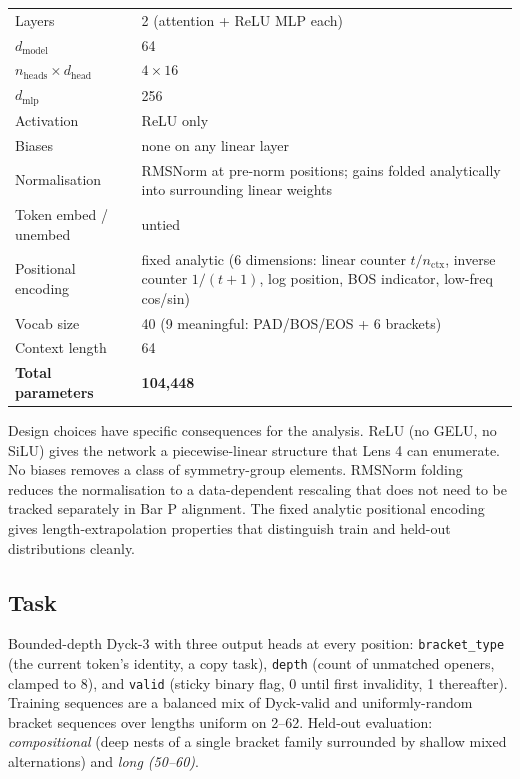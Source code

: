 \documentclass[11pt,letterpaper]{article}
\newcommand{\dmodel}{d_{\mathrm{model}}}
\begin{document}
\begin{center}
\begin{tabular}{ll}
\toprule
Layers & 2 (attention + ReLU MLP each) \\
$\dmodel$ & 64 \\
$n_{\mathrm{heads}} \times d_{\mathrm{head}}$ & $4 \times 16$ \\
$d_{\mathrm{mlp}}$ & 256 \\
Activation & ReLU only \\
Biases & none on any linear layer \\
Normalisation & RMSNorm at pre-norm positions; gains folded analytically into surrounding linear weights \\
Token embed / unembed & untied \\
Positional encoding & fixed analytic (6 dimensions: linear counter $t/n_{\mathrm{ctx}}$, inverse counter $1/(t+1)$, log position, BOS indicator, low-freq cos/sin) \\
Vocab size & 40 (9 meaningful: PAD/BOS/EOS + 6 brackets) \\
Context length & 64 \\
\textbf{Total parameters} & \textbf{104{,}448} \\
\bottomrule
\end{tabular}
\end{center}

Design choices have specific consequences for the analysis. ReLU (no GELU, no SiLU) gives the network a piecewise-linear structure that Lens 4 can enumerate. No biases removes a class of symmetry-group elements. RMSNorm folding reduces the normalisation to a data-dependent rescaling that does not need to be tracked separately in Bar P alignment. The fixed analytic positional encoding gives length-extrapolation properties that distinguish train and held-out distributions cleanly.

\subsection{Task}

Bounded-depth Dyck-3 with three output heads at every position: \texttt{bracket\_type} (the current token's identity, a copy task), \texttt{depth} (count of unmatched openers, clamped to 8), and \texttt{valid} (sticky binary flag, 0 until first invalidity, 1 thereafter). Training sequences are a balanced mix of Dyck-valid and uniformly-random bracket sequences over lengths uniform on 2--62. Held-out evaluation: \emph{compositional} (deep nests of a single bracket family surrounded by shallow mixed alternations) and \emph{long (50--60)}.
\end{document}
